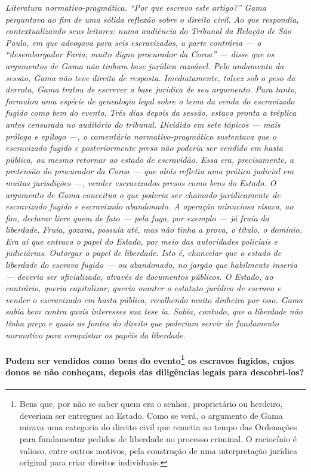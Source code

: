 \begin{resumo}
\emph{Literatura normativo-pragmática. ``Por que escrevo este artigo?''
Gama perguntava ao fim de uma sólida reflexão sobre o direito civil. Ao
que respondia, contextualizando seus leitores: numa audiência do
Tribunal da Relação de São Paulo, em que advogava para seis
escravizados, a parte contrária --- o ``desembargador Faria, muito digno
procurador da Coroa'' --- disse que os argumentos de Gama não tinham base
jurídica razoável. Pelo andamento da sessão, Gama não teve direito de
resposta. Imediatamente, talvez sob o peso da derrota, Gama tratou de
escrever a base jurídica de seu argumento. Para tanto, formulou uma
espécie de genealogia legal sobre o tema da venda do escravizado fugido
como bem do evento. Três dias depois da sessão, estava pronta a tréplica
antes censurada no auditório do tribunal. Dividido em sete tópicos ---
mais prólogo e epílogo ---, o comentário normativo-pragmático sustentava
que o escravizado fugido e posteriormente preso não poderia ser vendido
em hasta pública, ou mesmo retornar ao estado de escravidão. Essa era,
precisamente, a pretensão do procurador da Coroa --- que aliás refletia
uma prática judicial em muitas jurisdições ---, vender escravizados
presos como bens do Estado. O argumento de Gama conceitua o que poderia
ser chamado juridicamente de escravizado fugido e escravizado
abandonado. A operação minuciosa visava, ao fim, declarar livre quem de
fato --- pela fuga, por exemplo --- já fruía da liberdade. Fruía, gozava,
possuía até, mas não tinha a prova, o título, o domínio. Era aí que
entrava o papel do Estado, por meio das autoridades policiais e
judiciárias. Outorgar o papel de liberdade. Isto é, chancelar que o
estado de liberdade do escravo fugido --- ou abandonado, no jargão que
habilmente inseria --- deveria ser oficializado, através de documentos
públicos. O Estado, ao contrário, queria capitalizar; queria manter o
estatuto jurídico de escravo e vender o escravizado em hasta pública,
recolhendo muito dinheiro por isso. Gama sabia bem contra quais
interesses sua tese ia. Sabia, contudo, que a liberdade não tinha preço
e quais as fontes do direito que poderiam servir de fundamento normativo
para conquistar os papéis da liberdade.}
\end{resumo}

\paragraph{Podem ser vendidos como bens do evento\footnote{Bens que, por
  não se saber quem era o senhor, proprietário ou herdeiro, deveriam ser
  entregues ao Estado. Como se verá, o argumento de Gama mirava uma
  categoria do direito civil que remetia ao tempo das Ordenações para
  fundamentar pedidos de liberdade no processo criminal. O raciocínio é
  valioso, entre outros motivos, pela construção de uma interpretação
  jurídica original para criar direitos individuais.} os escravos
fugidos, cujos donos se não conheçam, depois das diligências legais para
descobri-los?}

